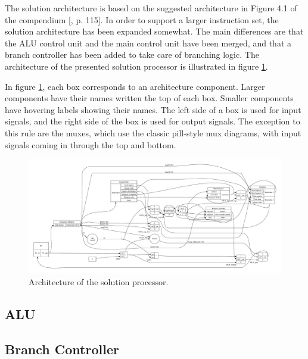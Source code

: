 The solution architecture is based on the suggested architecture in Figure 4.1 of the compendium [\cite{compendium}, p. 115].
In order to support a larger instruction set, the solution architecture has been expanded somewhat.
The main differences are that the ALU control unit and the main control unit have been merged, and that a branch controller has been added to take care of branching logic.
The architecture of the presented solution processor is illustrated in figure \ref{figure:cpu-architecture}.

In figure \ref{figure:cpu-architecture}, each box corresponds to an architecture component.
Larger components have their names written the top of each box.
Smaller components have hovering labels showing their names.
The left side of a box is used for input signals, and the right side of the box is used for output signals.
The exception to this rule are the muxes, which use the classic pill-style mux diagrams, with input signals coming in through the top and bottom.

\begin{figure}[h!]
	\begin{center}
		\includegraphics[keepaspectratio, height=\textheight, width=\textwidth]{graphics/cpu-architecture/cpu-architecture.pdf}
		\caption{Architecture of the solution processor.}
		\label{figure:cpu-architecture}
	\end{center}
\end{figure}

\subsection{ALU}



\subsection{Branch Controller}

